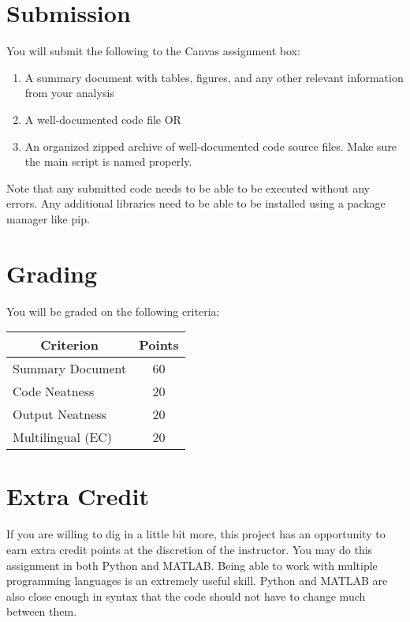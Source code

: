 \documentclass[
	letterpaper, %
	fontsize=10pt, %
	twoside=true, %
	numbers=noenddot, %
]{kaobook}
\begin{document}
\pagebreak

\section*{Submission}
You will submit the following to the Canvas assignment box:
\begin{enumerate}
    \item A summary document with tables, figures, and any other relevant information from your analysis
    \item A well-documented code file OR
    \item An organized zipped archive of well-documented code source files. Make sure the main script is named properly.
\end{enumerate}



Note that any submitted code needs to be able to be executed without any errors. Any additional libraries need to be able to be installed using a package manager like pip.


\section*{Grading}
You will be graded on the following criteria:

\begin{table}[h!]
    \begin{tabular}{l | c}
        \toprule
        \multicolumn{1}{c|}{\textbf{Criterion}} & \textbf{Points} \\
        \midrule
        Summary Document & 60 \\
        Code Neatness & 20 \\
        Output Neatness & 20 \\
        Multilingual (EC) & 20 \\
        \bottomrule
    \end{tabular}
\end{table}

\section*{Extra Credit}
If you are willing to dig in a little bit more, this project has an opportunity to earn extra credit points at the discretion of the instructor.
You may do this assignment in both Python and MATLAB. 
Being able to work with multiple programming languages is an extremely useful skill.
Python and MATLAB are also close enough in syntax that the code should not have to change much between them.
\end{document}
